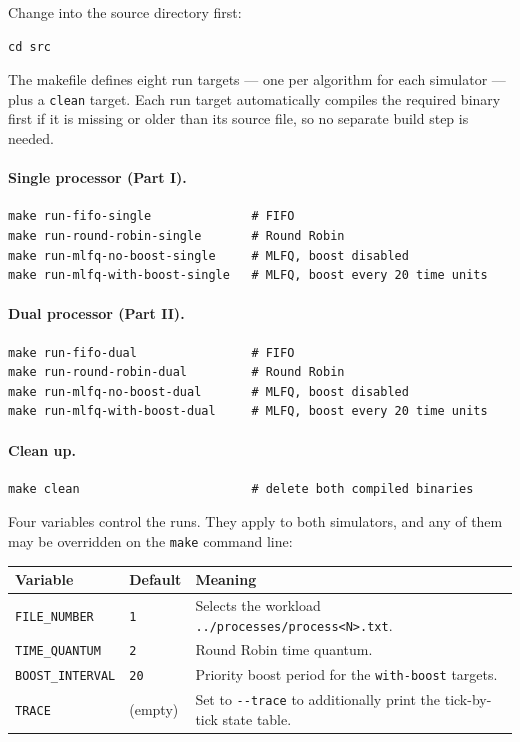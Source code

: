 \documentclass[11pt,a4paper]{article}
\begin{document}
Change into the source directory first:

\begin{lstlisting}
cd src
\end{lstlisting}

The makefile defines eight run targets --- one per algorithm for each simulator --- plus a
\texttt{clean} target. Each run target automatically compiles the required binary first if
it is missing or older than its source file, so no separate build step is needed.

\paragraph{Single processor (Part I).}
\begin{lstlisting}
make run-fifo-single              # FIFO
make run-round-robin-single       # Round Robin
make run-mlfq-no-boost-single     # MLFQ, boost disabled
make run-mlfq-with-boost-single   # MLFQ, boost every 20 time units
\end{lstlisting}

\paragraph{Dual processor (Part II).}
\begin{lstlisting}
make run-fifo-dual                # FIFO
make run-round-robin-dual         # Round Robin
make run-mlfq-no-boost-dual       # MLFQ, boost disabled
make run-mlfq-with-boost-dual     # MLFQ, boost every 20 time units
\end{lstlisting}

\paragraph{Clean up.}
\begin{lstlisting}
make clean                        # delete both compiled binaries
\end{lstlisting}

Four variables control the runs. They apply to both simulators, and any of them may be
overridden on the \texttt{make} command line:

\begin{center}
\begin{tabular}{ll>{\raggedright\arraybackslash}p{7.4cm}}
\toprule
\textbf{Variable} & \textbf{Default} & \textbf{Meaning} \\
\midrule
\texttt{FILE\_NUMBER}    & \texttt{1}  & Selects the workload
                                         \texttt{../processes/process<N>.txt}. \\
\texttt{TIME\_QUANTUM}   & \texttt{2}  & Round Robin time quantum. \\
\texttt{BOOST\_INTERVAL} & \texttt{20} & Priority boost period for the
                                         \texttt{with-boost} targets. \\
\texttt{TRACE}           & (empty)     & Set to \texttt{-{}-trace} to additionally print the
                                         tick-by-tick state table. \\
\bottomrule
\end{tabular}
\end{center}
\end{document}
